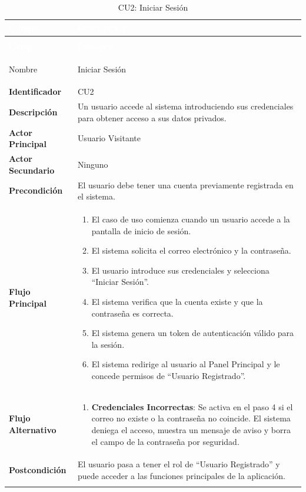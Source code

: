 \begingroup
\small 
\renewcommand{\arraystretch}{1.4}
\begin{xltabular}{\textwidth}{|>{\bfseries}p{3.5cm}|X|}
    \textcolor{white}{Campo} & \textcolor{white}{Descripción} \\ \hline
    \endfirsthead

     \\
    \hline
    \textcolor{white}{Campo} & \textcolor{white}{Descripción} \\ \hline
    \endhead

    Nombre & Iniciar Sesión \\ \hline
    Identificador & CU2 \\ \hline
    Descripción & Un usuario accede al sistema introduciendo sus credenciales para obtener acceso a sus datos privados. \\ \hline
    Actor Principal & Usuario Visitante \\ \hline
    Actor Secundario & Ninguno \\ \hline
    Precondición & El usuario debe tener una cuenta previamente registrada en el sistema. \\ \hline
    Flujo Principal & 
    \begin{enumerate}[leftmargin=0.5cm, topsep=0pt, partopsep=0pt, parsep=0pt, itemsep=4pt]
        \item El caso de uso comienza cuando un usuario accede a la pantalla de inicio de sesión.
        \item El sistema solicita el correo electrónico y la contraseña.
        \item El usuario introduce sus credenciales y selecciona ``Iniciar Sesión''.
        \item El sistema verifica que la cuenta existe y que la contraseña es correcta.
        \item El sistema genera un token de autenticación válido para la sesión.
        \item El sistema redirige al usuario al Panel Principal y le concede permisos de ``Usuario Registrado''.
    \end{enumerate} 
    \\ \hline
    Flujo Alternativo & 
    \begin{enumerate}[leftmargin=0.5cm, topsep=0pt, partopsep=0pt, parsep=0pt, itemsep=4pt]
        \item \textbf{Credenciales Incorrectas}: Se activa en el paso 4 si el correo no existe o la contraseña no coincide. El sistema deniega el acceso, muestra un mensaje de aviso y borra el campo de la contraseña por seguridad.
    \end{enumerate}
    \\ \hline
    Postcondición & El usuario pasa a tener el rol de ``Usuario Registrado'' y puede acceder a las funciones principales de la aplicación. \\ \hline
    \caption{CU2: Iniciar Sesión}
    \label{tab:esp_cu2} \\
\end{xltabular}
\endgroup


